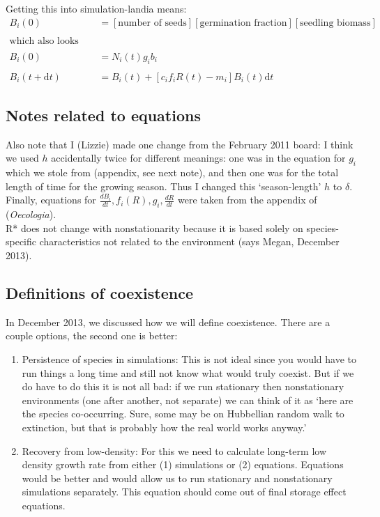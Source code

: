 \documentclass[11pt,a4paper,oneside]{article}
\begin{document}
\noindent Getting this into simulation-landia means:
\begin{align*}
B_{i}(0) & = [\text{number of seeds}][\text{germination
  fraction}][\text{seedling biomass}]
\\
\\
\text{which also looks like:}
\\
\\
B_{i}(0) & = N_{i}(t) g_{i}b_{i}
\\
\\
B_{i}(t+\mathrm{d}t) & =B_{i}(t)+[c_{i}f_{i}R(t)-m_{i}]B_{i}(t)\mathrm{d}t
\end{align*}

\subsection{Notes related to equations}

\noindent Also note that I (Lizzie) made one change from the February 2011 board: I think we
used \(h\) accidentally twice for different meanings: one was in the
equation for \(g_{i}\) which we stole from \cite{Chesson:2004eo}
(appendix, see next note), and then one was for the total length of time for the
growing season. Thus I changed this `season-length' \(h\) to
\(\delta\).\\

\noindent Finally, equations for \(\frac{dB_{i}}{dt}, f_{i}(R), g_{i},
\frac{dR}{dt}\) were taken from the appendix of \cite{Chesson:2004eo} (\emph{Oecologia}).\\

\noindent R* does not change with nonstationarity because it is based solely on species-specific characteristics not related to the environment (says Megan, December 2013).

\subsection{Definitions of coexistence}\label{definecoexist}
\noindent In December 2013, we discussed how we will define coexistence. There are a couple options, the second one is better:
\begin{enumerate}
\item Persistence of species in simulations: This is not ideal since you would have to run things a long time and still not know what would truly coexist. But if we do have to do this it is not all bad: if we run stationary then nonstationary environments (one after another, not separate) we can think of it as `here are the species co-occurring. Sure, some may be on Hubbellian random walk to extinction, but that is probably how the real world works anyway.' 
\item Recovery from low-density: For this we need to calculate long-term low density growth rate from either (1) simulations or (2) equations. Equations would be better and would allow us to run stationary and nonstationary simulations separately. This equation should come out of final storage effect equations.
\end{enumerate}
\end{document}
